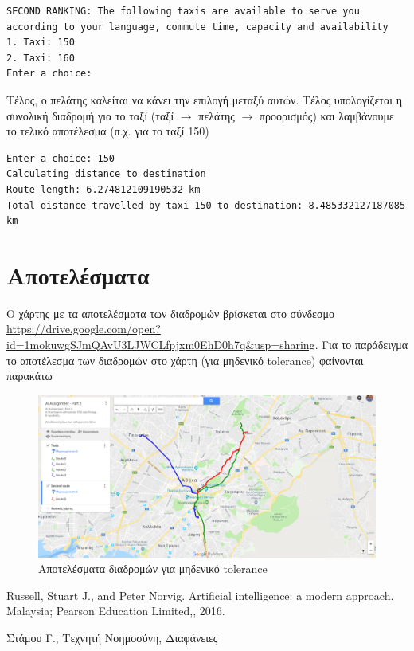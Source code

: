 \documentclass[a4paper,12pt]{article}
\begin{document}
\begin{lstlisting}
SECOND RANKING: The following taxis are available to serve you according to your language, commute time, capacity and availability
1. Taxi: 150
2. Taxi: 160
Enter a choice: 
\end{lstlisting} 

Τέλος, ο πελάτης καλείται να κάνει την επιλογή μεταξύ αυτών. Τέλος υπολογίζεται η συνολική διαδρομή για το ταξί (ταξί $\to$ πελάτης $\to$ προορισμός) και λαμβάνουμε το τελικό αποτέλεσμα (π.χ. για το ταξί 150)

\begin{lstlisting}
Enter a choice: 150
Calculating distance to destination
Route length: 6.274812109190532 km
Total distance travelled by taxi 150 to destination: 8.485332127187085 km
\end{lstlisting}


\section{Αποτελέσματα}

Ο χάρτης με τα αποτελέσματα των διαδρομών βρίσκεται στο σύνδεσμο \url{https://drive.google.com/open?id=1mokuwgSJmQAvU3LJWCLfpjxm0EhD0h7q&usp=sharing}. Για το παράδειγμα το αποτέλεσμα των διαδρομών στο χάρτη (για μηδενικό tolerance) φαίνονται παρακάτω

\begin{figure}[H]
\centering
\includegraphics[scale=0.25]{example.png}
\caption{Αποτελέσματα διαδρομών για μηδενικό tolerance}
\label{}
\end{figure}




\begin{thebibliography}{9}

 Russell, Stuart J., and Peter Norvig. Artificial intelligence: a modern approach. Malaysia; Pearson Education Limited,, 2016.

 Στάμου Γ., Τεχνητή Νοημοσύνη, Διαφάνειες

\end{thebibliography}
\end{document}

